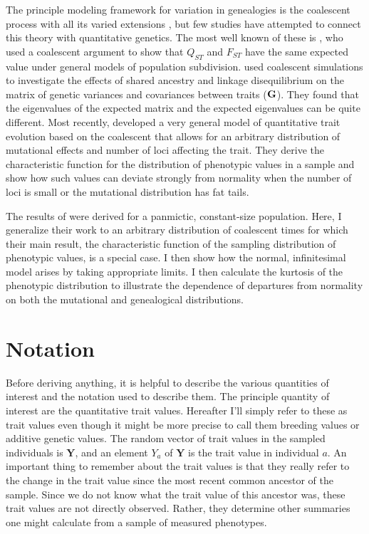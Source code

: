 \documentclass{article}
\begin{document}
The principle modeling framework for variation in genealogies is the coalescent
process with all its varied extensions \citep{Wakeley2008}, but few studies have
attempted to connect this theory with quantitative genetics. The most well known
of these is \citet{Whitlock1999}, who used a coalescent argument to show that
$Q_{ST}$ and $F_{ST}$ have the same expected value under general models of
population subdivision. \citet{Griswold2007} used coalescent simulations to
investigate the effects of shared ancestry and linkage disequilibrium on the
matrix of genetic variances and covariances between traits
($\mbox{\textbf{G}}$). They found that the eigenvalues of the expected matrix
and the expected eigenvalues can be quite different. Most recently,
\citet{Schraiber2015} developed a very general model of quantitative trait
evolution based on the coalescent that allows for an arbitrary distribution of
mutational effects and number of loci affecting the trait. They derive the
characteristic function for the distribution of phenotypic values in a sample
and show how such values can deviate strongly from normality when the number of
loci is small or the mutational distribution has fat tails.

The results of \citet{Schraiber2015} were derived for a panmictic, constant-size
population. Here, I generalize their work to an arbitrary distribution of
coalescent times for which their main result, the characteristic function of the
sampling distribution of phenotypic values, is a special case. I then show how
the normal, infinitesimal model arises by taking appropriate limits. I then
calculate the kurtosis of the phenotypic distribution to illustrate the
dependence of departures from normality on both the mutational and genealogical
distributions.

\section{Notation}
Before deriving anything, it is helpful to describe the various quantities of
interest and the notation used to describe them. The principle quantity of
interest are the quantitative trait values. Hereafter I'll simply refer to these
as trait values even though it might be more precise to call them breeding
values or additive genetic values. The random vector of trait values in the
sampled individuals is $\mathbf{Y}$, and an element $Y_a$ of $\mathbf{Y}$ is the
trait value in individual $a$. An important thing to remember about the trait
values is that they really refer to the change in the trait value since the most
recent common ancestor of the sample. Since we do not know what the trait value
of this ancestor was, these trait values are not directly observed. Rather, they
determine other summaries one might calculate from a sample of measured
phenotypes.
\end{document}

